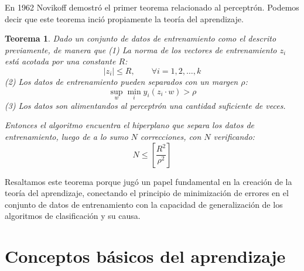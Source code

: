 \documentclass{report}
\newtheorem{thm}{Teorema}[section]
\begin{document}
En 1962 Novikoff demostró el primer teorema relacionado al perceptrón. Podemos decir que este teorema inció propiamente la teoría del aprendizaje.

\begin{thm}
Dado un conjunto de datos de entrenamiento como el descrito previamente, de manera que\newline
(1) La norma de los vectores de entrenamiento $z_i$ está acotada por una constante $R$:
\[
|z_i| \leq R, \qquad \forall i=1,2,\dots,k
\]
(2) Los datos de entrenamiento pueden separados con un margen $\rho$:
\[
\sup_{w} \min_{i} y_i(z_i\cdot w) > \rho
\]
(3) Los datos son alimentandos al perceptrón una cantidad \textit{suficiente} de veces.

Entonces el algoritmo encuentra el hiperplano que separa los datos de entrenamiento, luego de a lo
sumo $N$ correcciones, con $N$ verificando:
\[
N \leq \left [ \frac{R^2}{\rho^2}\right ]
\]

\end{thm}

Resaltamos este teorema porque jugó un papel fundamental en la creación de la teoría del aprendizaje, conectando el
principio de minimización de errores en el conjunto de datos de entrenamiento con la capacidad de generalización
de los algoritmos de clasificación y su causa.

\section{Conceptos básicos del aprendizaje}
\end{document}
